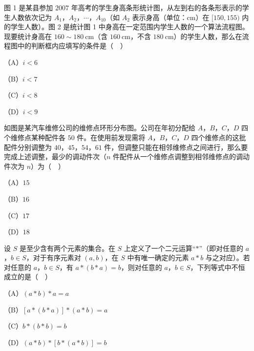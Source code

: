 \begingroup
\renewenvironment{question}{\Needspace{0.35\textheight}}{}
\begin{question}
图 1 是某县参加 $2007$ 年高考的学生身高条形统计图，从左到右的各条形表示的学生人数依次记为 $A_1$，$A_2$，$\cdots$，$A_{10}$（如 $A_2$ 表示身高（单位：$\mathrm{cm}$）在 $[150,155)$ 内的学生人数）。图 2 是统计图 1 中身高在一定范围内学生人数的一个算法流程图。现要统计身高在 $160\sim180\ \mathrm{cm}$（含 $160\ \mathrm{cm}$，不含 $180\ \mathrm{cm}$）的学生人数，那么在流程图中的判断框内应填写的条件是（　）
\nopagebreak[4]
\begin{center}\end{center}
\nopagebreak[4]
\nopagebreak[4]
\begin{center}\end{center}
\nopagebreak[4]
（A）$i<6$

（B）$i<7$

（C）$i<8$

（D）$i<9$

\Needspace{0.4\textheight}
\end{question}
\endgroup
\begin{question}
如图是某汽车维修公司的维修点环形分布图。公司在年初分配给 $A$，$B$，$C$，$D$ 四个维修点某种配件各 $50$ 件。在使用前发现需将 $A$，$B$，$C$，$D$ 四个维修点的这批配件分别调整为 $40$，$45$，$54$，$61$ 件，但调整只能在相邻维修点之间进行，那么要完成上述调整，最少的调动件次（$n$ 件配件从一个维修点调整到相邻维修点的调动件次为 $n$）为（　）
\nopagebreak[4]
\begin{center}\end{center}
\nopagebreak[4]
（A）$15$

（B）$16$

（C）$17$

（D）$18$

\end{question}
\begin{question}
设 $S$ 是至少含有两个元素的集合。在 $S$ 上定义了一个二元运算“$*$”（即对任意的 $a$，$b\in S$，对于有序元素对 $(a,b)$，在 $S$ 中有唯一确定的元素 $a*b$ 与之对应）。若对任意的 $a$，$b\in S$，有 $a*(b*a)=b$，则对任意的 $a$，$b\in S$，下列等式中不恒成立的是（　）

（A）$(a*b)*a=a$

（B）$[a*(b*a)]*(a*b)=a$

（C）$b*(b*b)=b$

（D）$(a*b)*[b*(a*b)]=b$

\end{question}

